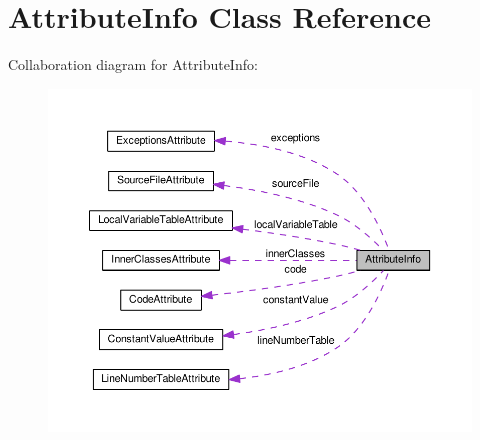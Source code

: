 \hypertarget{classAttributeInfo}{}\section{Attribute\+Info Class Reference}
\label{classAttributeInfo}


Collaboration diagram for Attribute\+Info\+:\nopagebreak
\begin{figure}[H]
\begin{center}
\leavevmode
\includegraphics[width=350pt]{classAttributeInfo__coll__graph}
\end{center}
\end{figure}
